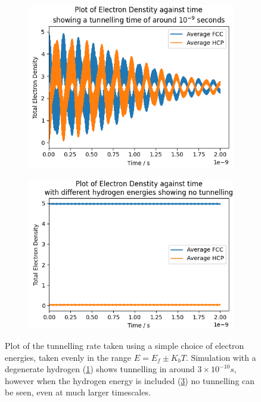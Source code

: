 \begin{figure}[htb]
    \centering
    \begin{subfigure}{0.45\linewidth}
        \includegraphics[width=0.9\linewidth]{Figures/Simulation/Plot of large band simulation decay times.png}
        \label{fig:large band degenerate simulation}
    \end{subfigure}
    \begin{subfigure}{0.45\linewidth}
        \includegraphics[width=0.9\linewidth]{Figures/Simulation/Plot of large band simulation with hydrogen energies.png}
        \label{fig:large band non degenerate simulation}
    \end{subfigure}
    \caption{Plot of the tunnelling rate taken using a
    simple choice of electron energies,
    taken evenly in the range \(E=E_f \pm K_b T\).
    Simulation with a degenerate hydrogen
    (\cref{fig:large band degenerate simulation})
    shows tunnelling in around
    \(3\times{}10^{-10}s\), however when the
    hydrogen energy is included (\cref{fig:large band non degenerate simulation})
    no tunnelling can be seen, even
    at much larger timescales.}
\end{figure}

